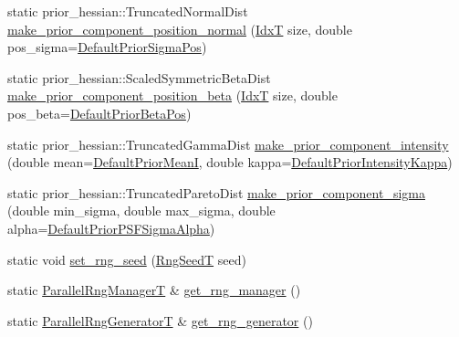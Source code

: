 \begin{DoxyCompactItemize}
\item 
static prior\+\_\+hessian\+::\+Truncated\+Normal\+Dist \hyperlink{classmappel_1_1PointEmitterModel_a70b1a5c81d227dce0ffb5910ffbf7387}{make\+\_\+prior\+\_\+component\+\_\+position\+\_\+normal} (\hyperlink{namespacemappel_ab17ec0f30b61ece292439d7ece81d3a8}{IdxT} size, double pos\+\_\+sigma=\hyperlink{classmappel_1_1PointEmitterModel_a38b73a91eaae7b5fd0977b88ea844280}{Default\+Prior\+Sigma\+Pos})
\item 
static prior\+\_\+hessian\+::\+Scaled\+Symmetric\+Beta\+Dist \hyperlink{classmappel_1_1PointEmitterModel_a1f6f12bdf0e6fc374bf217172fc0ccef}{make\+\_\+prior\+\_\+component\+\_\+position\+\_\+beta} (\hyperlink{namespacemappel_ab17ec0f30b61ece292439d7ece81d3a8}{IdxT} size, double pos\+\_\+beta=\hyperlink{classmappel_1_1PointEmitterModel_a2771dc4415f351862619cd9671b5310d}{Default\+Prior\+Beta\+Pos})
\item 
static prior\+\_\+hessian\+::\+Truncated\+Gamma\+Dist \hyperlink{classmappel_1_1PointEmitterModel_a41deeb728d8fae68ca474e97ea73d429}{make\+\_\+prior\+\_\+component\+\_\+intensity} (double mean=\hyperlink{classmappel_1_1PointEmitterModel_a607fcdea787b0cc3c6ac8804d378d1b1}{Default\+Prior\+MeanI}, double kappa=\hyperlink{classmappel_1_1PointEmitterModel_a03d9f90c130df2d42d0d31c9337e914c}{Default\+Prior\+Intensity\+Kappa})
\item 
static prior\+\_\+hessian\+::\+Truncated\+Pareto\+Dist \hyperlink{classmappel_1_1PointEmitterModel_a7506af8d9e430e63a56972eb64709fca}{make\+\_\+prior\+\_\+component\+\_\+sigma} (double min\+\_\+sigma, double max\+\_\+sigma, double alpha=\hyperlink{classmappel_1_1PointEmitterModel_a2b06111eaa1ff284851c2e67a3827220}{Default\+Prior\+P\+S\+F\+Sigma\+Alpha})
\item 
static void \hyperlink{classmappel_1_1PointEmitterModel_a046d5bd901c8dfde61f082c2634beec0}{set\+\_\+rng\+\_\+seed} (\hyperlink{namespacemappel_a318bca259a7add5979160939a3f4e60b}{Rng\+SeedT} seed)
\item 
static \hyperlink{namespacemappel_acf276a4212f07b1ed4cb2ddce379ba1d}{Parallel\+Rng\+ManagerT} \& \hyperlink{classmappel_1_1PointEmitterModel_ae876f0fa81613161a064452973bfb558}{get\+\_\+rng\+\_\+manager} ()
\item 
static \hyperlink{namespacemappel_ad1e99b214465229065d30f881a89d1cc}{Parallel\+Rng\+GeneratorT} \& \hyperlink{classmappel_1_1PointEmitterModel_af9f6630e9d496bb83e151f00522ecc2d}{get\+\_\+rng\+\_\+generator} ()
\end{DoxyCompactItemize}
